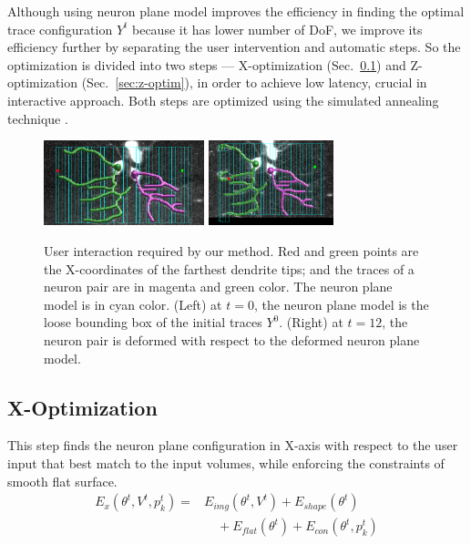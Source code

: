 \documentclass{article}
\begin{document}
Although using neuron plane model improves the efficiency in finding the optimal trace configuration $Y^t$ because it has lower number of DoF, we improve its efficiency further by separating the user intervention and automatic steps. So the optimization is divided into two steps --- X-optimization (Sec.~\ref{sec:x-optim}) and Z-optimization (Sec.~\ref{sec:z-optim}), in order to achieve low latency, crucial in interactive approach. Both steps are optimized using the simulated annealing technique \cite{Kirkpatrick1983}.

\begin{figure}[b]
	\centering
	\vspace{-10pt}
	\includegraphics[height=70pt]{img/user_ui}
	\includegraphics[height=70pt]{img/user_ui13}
	\vspace{-10pt}
	\caption{\small{User interaction required by our method. Red and green points are the X-coordinates of the farthest dendrite tips; and the traces of a neuron pair are in magenta and green color. The neuron plane model is in cyan color. (Left) at $t=0$, the neuron plane model is the loose bounding box of the initial traces $Y^0$. (Right) at $t=12$, the neuron pair is deformed with respect to the deformed neuron plane model.}}
	\vspace{-10pt}
	\label{fig:ui}
\end{figure}


\subsection{X-Optimization} \label{sec:x-optim}
This step finds the neuron plane configuration in X-axis with respect to the user input that best match to the input volumes, while enforcing the constraints of smooth flat surface.
\begin{equation}
\begin{split}
E_{x}(\theta^t,V^t,p^t_k) = & E_{img}(\theta^t,V^t) + E_{shape}(\theta^t) \\
& \quad + E_{flat}(\theta^t) + E_{con}(\theta^t, p^t_k)
\end{split}
\end{equation} 
\end{document}
